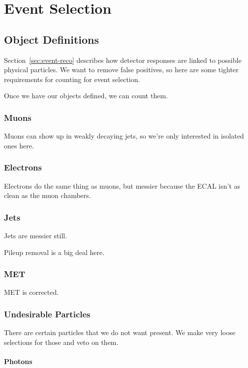 \chapter{Event Selection} \label{ch:selection}

\section{Object Definitions}

Section~\ref{sec:event-reco} describes how
detector responses are linked to possible physical particles.
We want to remove false positives,
so here are some tighter requirements for counting for event selection.

Once we have our objects defined,
we can count them.

\subsection{Muons}

Muons can show up in weakly decaying jets,
so we're only interested in isolated ones here.

\subsection{Electrons}

Electrons do the same thing as muons,
but messier because the ECAL isn't as clean as the muon chambers.

\subsection{Jets}

Jets are messier still.

Pileup removal is a big deal here.

\subsection{MET}

MET is corrected.

\subsection{Undesirable Particles}

There are certain particles that we do not want present.
We make very loose selections for those and veto on them.

\subsubsection{Photons}

